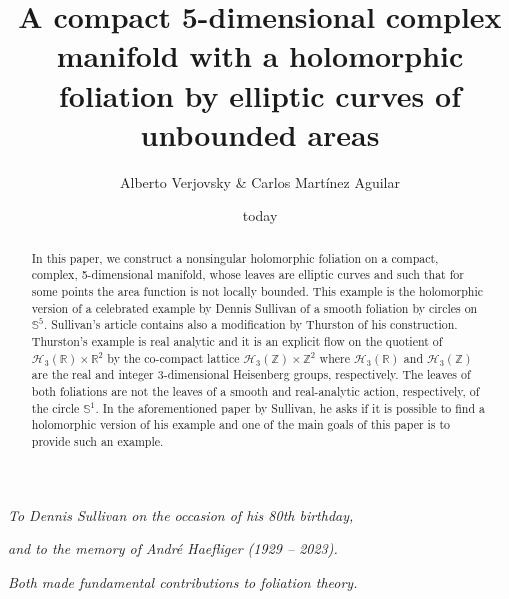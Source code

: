 \documentclass[A4paper,11pt]{amsart}
\title[Foliation by elliptic curves of unbounded area]{A compact 5-dimensional complex manifold with a holomorphic foliation by elliptic curves of unbounded areas}
\author[Alberto Verjovsky, Carlos Martínez Aguilar]{Alberto Verjovsky \& Carlos Martínez Aguilar}
\date{today}
\newcommand{\R}{\mathbb{R}}
\newcommand{\Z}{\mathbb{Z}}
\newcommand{\sS}{\mathbb{S}}
\theoremstyle{definition}
\theoremstyle{named}
\begin{document}
\maketitle

{\footnotesize
\centerline{\it To Dennis Sullivan on the occasion of his 80th birthday,}
\centerline{\it and to the memory of André Haefliger  (1929 – 2023). }
\centerline{\it  Both  made fundamental  contributions to foliation theory.}
}




\begin{abstract} In this paper, we construct a nonsingular holomorphic foliation on a compact, complex, 5-dimensional manifold, whose 
leaves are elliptic curves and such that for some points the area function is not locally bounded.
This example is the holomorphic version of a celebrated example by Dennis Sullivan 
of a smooth foliation by circles on $\sS^5$. Sullivan’s article contains also a modification by Thurston of his construction. Thurston’s example is real analytic and it is an explicit flow on the quotient of $\mathcal{H}_3(\R)\times\R^2$ by the co-compact lattice $\mathcal{H}_3(\Z)\times\Z^2$ where $\mathcal{H}_3(\R)$ and $\mathcal{H}_3(\Z)$ are the real and integer 3-dimensional Heisenberg groups, respectively. The  leaves of both foliations are not the leaves of a smooth and real-analytic action, 
respectively,  of the circle $\sS^1$. In the aforementioned paper by Sullivan, he asks if it is possible to find a holomorphic version of his example and one of the main  goals of this paper is to provide such an example.
\end{abstract} 
\end{document}
